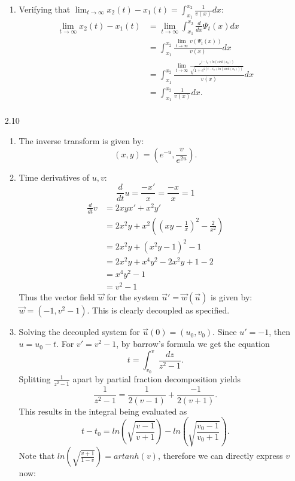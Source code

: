 \documentclass[12pt, letterpaper]{article}
\begin{document}
\begin{enumerate}
\begin{enumerate}
			\item 
			Verifying that $\lim_{t \to \infty} x_2(t) - x_1(t) = \int_{x_1}^{x_2} \frac{1}{v(x)}dx$:
			\begin{align*}
				\lim_{t \to \infty} x_2(t) - x_1(t) &= \lim_{t \to \infty} \int_{x_1}^{x_2} \frac{d}{dx} \Psi_t(x)dx\\
				&= \int_{x_1}^{x_2}\frac{\lim_{t \to \infty} v(\Psi_t (x))}{v(x)}dx\\
				&= \int_{x_1}^{x_2}\frac{\lim_{t \to \infty} \frac{e^{t- t_0 + ln(sinh(x_0))}}{\sqrt{1 + e^{2(t- t_0 + ln(sinh(x_0)))}}}}{v(x)}dx\\
				&= \int_{x_1}^{x_2}\frac{1}{v(x)}dx.\\
			\end{align*}
		\end{enumerate}
	\item[2.10]
	\begin{enumerate}
		\item The inverse transform is given by:
		$$
		(x,y) = (e^{-u}, \frac{v}{e^{2u}}).
		$$
		\item Time derivatives of $u,v$:
			$$
				\frac{d}{dt}u = \frac{-x'}{x} = \frac{-x}{x} = 1                                                                              
			$$
			\begin{align*}
			\frac{d}{dt}v &= 2xy x' + x^2 y'\\
			&= 2x^2 y + x^2((xy-\frac{1}{x})^2 -\frac{2}{x^2})\\	
			&= 2x^2 y + (x^2y -1)^2 - 1\\
			&= 2x^2 y + x^4y^2 -2x^2y + 1 - 2\\
			&= x^4y^2 -1\\
			&= v^2 - 1
			\end{align*}
			Thus the vector field $\vec{w}$ for the system $\Vec{u}' = \Vec{w}(\Vec{u})$ is given by:
			$\Vec{w} = (-1,v^2 -1)$.  This is clearly decoupled as specified.
		\item Solving the decoupled system for $\Vec{u}(0) = (u_0,v_0)$.  
			Since $u' = -1$, then $u = u_0 - t.$  For $v' = v^2 - 1$, by barrow's formula we get the equation
			$$
				t = \int_{v_0}^v \frac{dz}{z^2 - 1}.		
			$$
			Splitting $\frac{1}{z^2 - 1}$ apart by partial fraction decomposition yields
			$$
				\frac{1}{z^2 - 1} =  \frac{1}{2(v-1)} + \frac{-1}{2(v+1)}.
			$$
			This results in the integral being evaluated as 
			$$
				t - t_0 = ln\left(\sqrt{\frac{v-1}{v+1}}\right) - ln \left( \sqrt{\frac{v_0-1}{v_0 + 1}} \right).			
			$$
			\iffalse
			Note that $ln\left(\sqrt{\frac{v+1}{1-v}}\right) = artanh(v)$, therefore we can directly express $v$ now:

\end{enumerate}
\end{enumerate}
\end{document}
